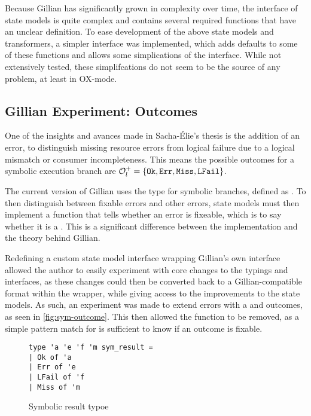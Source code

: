 Because Gillian has significantly grown in complexity over time, the interface of state models  is quite complex and contains several required functions that have an unclear definition. To ease development of the above state models and transformers, a simpler interface  was implemented, which adds defaults to some of these functions and allows some simplications of the interface. While not extensively tested, these simplifcations do not seem to be the source of any problem, at least in OX-mode.

\subsection{Gillian Experiment: Outcomes}

One of the insights and avances made in Sacha-Élie's thesis is the addition of an \LFail{} error, to distinguish missing resource errors from logical failure due to a logical mismatch or consumer incompleteness. This means the possible outcomes for a symbolic execution branch are ${\cal O}_l^+ = \{\texttt{Ok},\texttt{Err}, \texttt{Miss}, \texttt{LFail}\}$.

The current version of Gillian uses the  type for symbolic branches, defined as . To then distinguish between fixable \Miss{} errors and other errors, state models must then implement a  function that tells whether an error is fixeable, which is to say whether it is a \Miss. This is a significant difference between the implementation and the theory behind Gillian.

Redefining a custom state model interface wrapping Gillian's own interface allowed the author to easily experiment with core changes to the typings and interfaces, as these changes could then be converted back to a Gillian-compatible format within the wrapper, while giving access to the improvements to the state models. As such, an experiment was made to extend errors with a \Miss{} and \LFail{} outcomes, as seen in \autoref{fig:sym-outcome}. This then allowed the  function to be removed, as a simple pattern match for \Miss{} is sufficient to know if an outcome is fixable.

\begin{figure}[h]
\centering
\begin{lstlisting}
type 'a 'e 'f 'm sym_result =
| Ok of 'a
| Err of 'e
| LFail of 'f
| Miss of 'm
\end{lstlisting}
\caption{Symbolic result typoe}
\label{fig:sym-outcome}
\end{figure}

